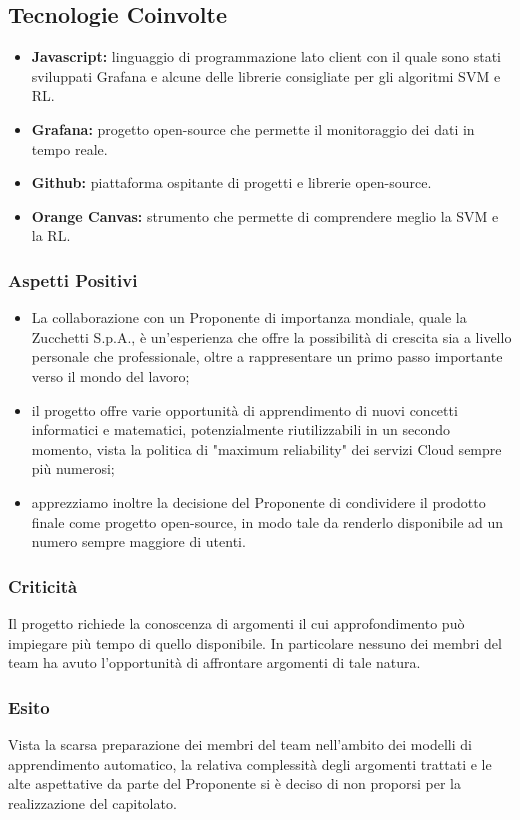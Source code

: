 	\subsection{Tecnologie Coinvolte}
	\begin{itemize}
		\item \textbf{Javascript}\textbf{:} linguaggio di programmazione lato client con il quale sono stati sviluppati Grafana e alcune delle librerie consigliate per gli algoritmi SVM e RL.
		\item \textbf{Grafana}\textbf{:} progetto open-source che permette il monitoraggio dei dati in tempo reale.
		\item \textbf{Github}\textbf{:} piattaforma ospitante di progetti e librerie open-source.
		\item \textbf{Orange Canvas}\textbf{:} strumento che permette di comprendere meglio la SVM e la RL.
	\end{itemize}
	
	\subsubsection{Aspetti Positivi}
	\begin{itemize}
		\item La collaborazione con un Proponente di importanza mondiale, quale la Zucchetti S.p.A., è un'esperienza che offre la possibilità di crescita sia a livello personale che professionale, oltre a rappresentare un primo passo importante verso il mondo del lavoro; 
		\item il progetto offre varie opportunità di apprendimento di nuovi concetti informatici e matematici, potenzialmente riutilizzabili in un secondo momento, vista la politica di "maximum reliability" dei servizi Cloud sempre più numerosi; 
		\item apprezziamo inoltre la decisione del Proponente di condividere il prodotto finale come progetto open-source, in modo tale da renderlo disponibile ad un numero sempre maggiore di utenti.
	\end{itemize}

	\subsubsection{Criticità}
		Il progetto richiede la conoscenza di argomenti il cui approfondimento può impiegare più tempo di quello disponibile. In particolare nessuno dei membri del team ha avuto l'opportunità di affrontare argomenti di tale natura.
	
	\subsubsection{Esito}
		Vista la scarsa preparazione dei membri del team nell'ambito dei modelli di apprendimento automatico, la relativa complessità degli argomenti trattati e le alte aspettative da parte del Proponente si è deciso di non proporsi per la realizzazione del capitolato.